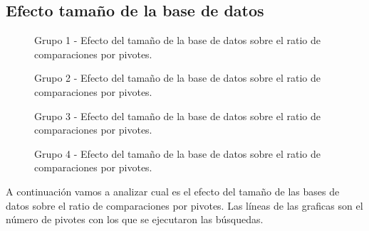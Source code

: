 \subsection{Efecto tamaño de la base de datos}

\begin{figure}[tb]
\centering
{}
		\caption{\small Grupo 1 - Efecto del tamaño de la base de datos sobre el ratio de comparaciones por pivotes.}
		\label{fig:EDB-g1}
		\caption{\small Grupo 2 - Efecto del tamaño de la base de datos sobre el ratio de comparaciones por pivotes.}
		\label{fig:EDB-g2}
\end{figure}

\begin{figure}[tb]
\centering
{}
		\caption{\small Grupo 3 - Efecto del tamaño de la base de datos sobre el ratio de comparaciones por pivotes.}
		\label{fig:EDB-g3}
\end{figure}

\begin{figure}[tb]
\centering
{}
		\caption{\small Grupo 4 - Efecto del tamaño de la base de datos sobre el ratio de comparaciones por pivotes.}
		\label{fig:EDB-g4}
\end{figure}
 
A continuaci\'on vamos a analizar cual es el efecto del tama\~no de las bases de datos sobre el ratio de comparaciones por pivotes. Las l\'ineas de las graficas son el n\'umero de pivotes con los que se ejecutaron las b\'usquedas.\\

